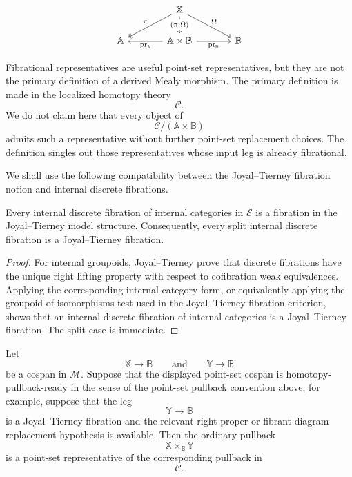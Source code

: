 \[
\begin{tikzcd}[column sep=large]
&
\mathbb X
\arrow[dl, "\pi"', two heads]
\arrow[dr, "\Omega"]
\arrow[d, "{(\pi,\Omega)}" description]
&
\\
\mathbb A
&
\mathbb A\times\mathbb B
\arrow[l, "\operatorname{pr}_{\mathbb A}"]
\arrow[r, "\operatorname{pr}_{\mathbb B}"']
&
\mathbb B
\end{tikzcd}
\]

\begin{remark}
\label{rem:fibrational-representatives-not-primary}
Fibrational representatives are useful point-set representatives, but
they are not the primary definition of a derived Mealy morphism. The
primary definition is made in the localized homotopy theory
\[
\mathcal C.
\]
We do not claim here that every object of
\[
\mathcal C/(\mathbb A\times\mathbb B)
\]
admits such a representative without further point-set replacement
choices. The definition singles out those representatives whose input
leg is already fibrational.
\end{remark}

We shall use the following compatibility between the Joyal--Tierney
fibration notion and internal discrete fibrations.

\begin{proposition}
\label{prop:split-discrete-fibrations-are-jt-fibrations-rewritten}
Every internal discrete fibration of internal categories in
\(\mathcal E\) is a fibration in the Joyal--Tierney model structure.
Consequently, every split internal discrete fibration is a
Joyal--Tierney fibration.
\end{proposition}

\begin{proof}
For internal groupoids, Joyal--Tierney prove that discrete fibrations
have the unique right lifting property with respect to cofibration weak
equivalences. Applying the corresponding internal-category form, or
equivalently applying the groupoid-of-isomorphisms test used in the
Joyal--Tierney fibration criterion, shows that an internal discrete
fibration of internal categories is a Joyal--Tierney fibration. The split
case is immediate.
\end{proof}

\begin{lemma}
\label{lem:point-set-pullback-along-fibration-derived}
Let
\[
\mathbb X\to\mathbb B
\qquad\text{and}\qquad
\mathbb Y\to\mathbb B
\]
be a cospan in \(\mathcal M\). Suppose that the displayed point-set
cospan is homotopy-pullback-ready in the sense of the point-set pullback
convention above; for example, suppose that the leg
\[
\mathbb Y\to\mathbb B
\]
is a Joyal--Tierney fibration and the relevant right-proper or fibrant
diagram replacement hypothesis is available. Then the ordinary pullback
\[
\mathbb X\times_{\mathbb B}\mathbb Y
\]
is a point-set representative of the corresponding pullback in
\[
\mathcal C.
\]
\end{lemma}

